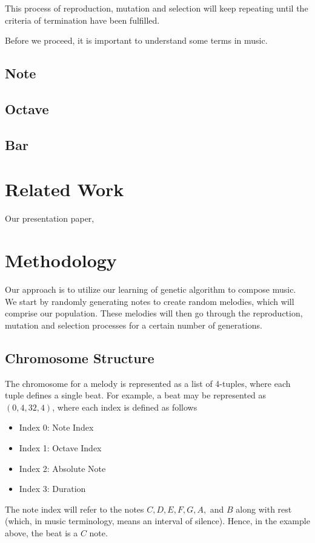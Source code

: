 \documentclass[conference]{IEEEtran}
\begin{document}
This process of reproduction, mutation and selection will keep repeating until the criteria of termination have been fulfilled.

Before we proceed, it is important to understand some terms in music.\\
\subsection{Note}

\subsection{Octave}

\subsection{Bar}

\section{Related Work}
Our presentation paper, 

\section{Methodology}
Our approach is to utilize our learning of genetic algorithm to compose music. We start by randomly generating notes to create random melodies, which will comprise our population. These melodies will then go through the reproduction, mutation and selection processes for a certain number of generations.

\subsection{Chromosome Structure}
The chromosome for a melody is represented as a list of 4-tuples, where each tuple defines a single beat. For example, a beat may be represented as $(0, 4, 32, 4)$, where each index is defined as follows
\begin{itemize}
	\item Index 0: Note Index
	\item Index 1: Octave Index
	\item Index 2: Absolute Note
	\item Index 3: Duration
\end{itemize}

The note index will refer to the notes $C, D, E, F, G, A,$ and $B$ along with rest (which, in music terminology, means an interval of silence). Hence, in the example above, the beat is a $C$ note.
\end{document}
